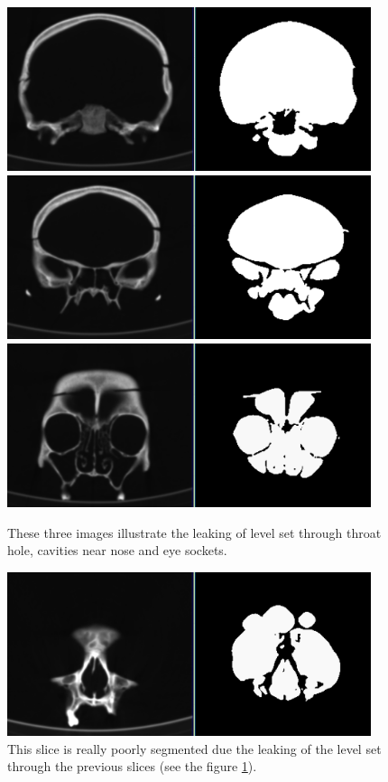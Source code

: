 \begin{figure}
    \centering
    \includegraphics[width=0.95\textwidth]{data/png/20}
    \includegraphics[width=0.95\textwidth]{data/png/23}
    \includegraphics[width=0.95\textwidth]{data/png/27}
    \caption[Result of segmentation front slices of the skull data set]
{
These three images illustrate the leaking of level set through throat hole, cavities near nose and eye sockets.
}
    \label{fg:frontSlicesSegmentation}
\end{figure}

\begin{figure}
    \centering
    \includegraphics[width=0.95\textwidth]{data/png/29}
    \caption[Result of segmentation of slices near nose]{
This slice is really poorly segmented due the leaking of the level set through the previous slices (see the figure \ref{fg:frontSlicesSegmentation}).
}
    \label{fg:noseSlicesSegmentation}
\end{figure}

